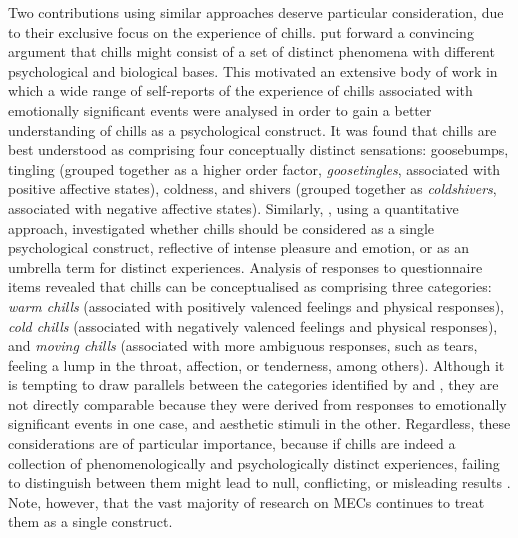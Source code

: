 Two contributions using similar approaches deserve particular consideration, due to their exclusive focus on the experience of chills. \textcite{maruskin2012} put forward a convincing argument that chills might consist of a set of distinct phenomena with different psychological and biological bases. This motivated an extensive body of work in which a wide range of self-reports of the experience of chills associated with emotionally significant events were analysed in order to gain a better understanding of chills as a psychological construct. It was found that chills are best understood as comprising four conceptually distinct sensations: goosebumps, tingling (grouped together as a higher order factor, \emph{goosetingles}, associated with positive affective states), coldness, and shivers (grouped together as \emph{coldshivers}, associated with negative affective states). Similarly, \textcite{bannister2019}, using a quantitative approach, investigated whether chills should be considered as a single psychological construct, reflective of intense pleasure and emotion, or as an umbrella term for distinct experiences. Analysis of responses to questionnaire items revealed that chills can be conceptualised as comprising three categories: \emph{warm chills} (associated with positively valenced feelings and physical responses), \emph{cold chills} (associated with negatively valenced feelings and physical responses), and \emph{moving chills} (associated with more ambiguous responses, such as tears, feeling a lump in the throat, affection, or tenderness, among others). Although it is tempting to draw parallels between the categories identified by \textcite{maruskin2012} and \textcite{bannister2019}, they are not directly comparable because they were derived from responses to emotionally significant events in one case, and aesthetic stimuli in the other. Regardless, these considerations are of particular importance, because if chills are indeed a collection of phenomenologically and psychologically distinct experiences, failing to distinguish between them might lead to null, conflicting, or misleading results \parencite{bannister2019, maruskin2012}. Note, however, that the vast majority of research on MECs continues to treat them as a single construct.

